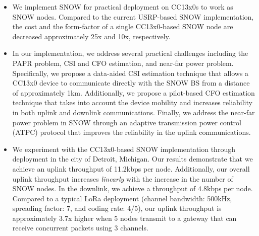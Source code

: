 \begin{itemize}
	\item We implement SNOW for practical deployment on CC13x0s to work as SNOW nodes. Compared to the current USRP-based SNOW implementation, the cost and the form-factor of a single CC13x0-based SNOW node are decreased approximately 25x and 10x, respectively.
	\item In our implementation, we address several practical challenges including the PAPR problem, CSI and CFO estimation, and near-far power problem. Specifically,
	we propose a data-aided CSI estimation technique that allows a CC13x0 device to communicate directly with the SNOW BS from a distance of approximately 1km. Additionally, we propose a pilot-based CFO estimation technique that takes into account the device mobility and increases reliability in both uplink and downlink communications. Finally, we address the near-far power problem in SNOW through an adaptive transmission power control (ATPC) protocol that improves the reliability in the uplink communications.
	\item We experiment with the CC13x0-based SNOW implementation through deployment in the city of Detroit, Michigan. Our results demonstrate that we achieve an uplink throughput of 11.2kbps per node.
	Additionally, our overall uplink throughput increases \emph{linearly} with the increase in the number of SNOW nodes. In the downlink, we achieve a throughput of 4.8kbps per node.
	Compared to a typical LoRa deployment (channel bandwidth: 500kHz, spreading factor: 7, and coding rate: 4/5), our uplink throughput is approximately 3.7x higher when 5 nodes transmit to a gateway that can receive concurrent packets using 3 channels.
\end{itemize}



